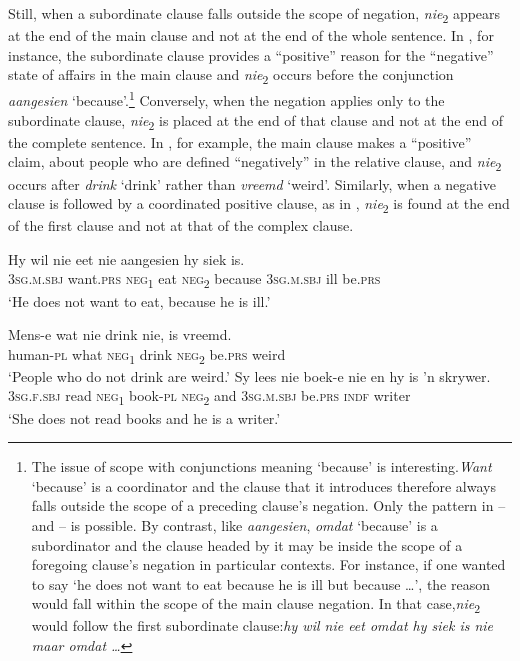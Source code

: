 \documentclass[output=paper,colorlinks,citecolor=brown]{langscibook}
\begin{document}
Still, when a subordinate clause falls outside the scope of negation, \textit{nie}\textsubscript{2} appears at the end of the main clause and not at the end of the whole sentence. In , for instance, the subordinate clause provides a “positive” reason for the “negative” state of affairs in the main clause and \textit{nie}\textsubscript{2} occurs before the conjunction \textit{aangesien} ‘because’.\footnote{The issue of scope with conjunctions meaning ‘because’ is interesting.\textit{Want} ‘because’ is a coordinator and the clause that it introduces therefore always falls outside the scope of a preceding clause’s negation. Only the pattern in  – and  – is possible. By contrast, like \textit{aangesien}, \textit{omdat} ‘because’ is a subordinator and the clause headed by it may be inside the scope of a foregoing clause’s negation in particular contexts. For instance, if one wanted to say ‘he does not want to eat because he is ill but because …’, the reason would fall within the scope of the main clause negation. In that case,\textit{nie}\textsubscript{2} would follow the first subordinate clause:\textit{hy wil nie eet omdat hy siek is nie maar omdat …}} Conversely, when the negation applies only to the subordinate clause, \textit{nie}\textsubscript{2} is placed at the end of that clause and not at the end of the complete sentence. In , for example, the main clause makes a “positive” claim, about people who are defined “negatively” in the relative clause, and \textit{nie}\textsubscript{2} occurs after \textit{drink} ‘drink’ rather than \textit{vreemd} ‘weird’. Similarly, when a negative clause is followed by a coordinated positive clause, as in , \textit{nie}\textsubscript{2} is found at the end of the first clause and not at that of the complex clause. 

\ea\label{ex:afr:37}
    \ea\label{ex:afr:37a}
        \gll Hy wil nie eet nie aangesien hy siek is. \\ 
             \textsc{3sg.m.sbj} want.\textsc{prs} \textsc{neg}\textsubscript{1} eat \textsc{neg}\textsubscript{2} because \textsc{3sg.m.sbj} ill be.\textsc{prs} \\
        \glt ‘He does not want to eat, because he is ill.’
    
    \ex\label{ex:afr:37b}
        \gll Mens-e wat nie drink nie, is vreemd. \\
             human-\textsc{pl} what \textsc{neg}\textsc\textsubscript{1} drink \textsc{neg}\textsubscript{2} be.\textsc{prs} weird \\
        \glt ‘People who do not drink are weird.’
    \ex\label{ex:afr:37c}
        \gll Sy lees nie boek-e nie en hy is ’n skrywer. \\
             \textsc{3sg.f.sbj} read  \textsc{neg}\textsubscript{1} book-\textsc{pl} \textsc{neg}\textsubscript{2} and  \textsc{3sg.m.sbj} be.\textsc{prs} \textsc{indf} writer \\
        \glt ‘She does not read books and he is a writer.’    
    \z
\z 
\end{document}
